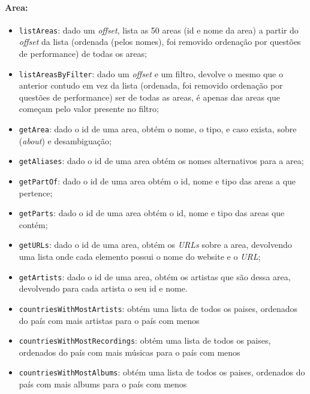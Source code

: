 \documentclass{article}
\begin{document}
\paragraph{\textbf{Area:}}
    \begin{itemize}
        \item \texttt{listAreas}: dado um \textit{offset}, lista as 50 areas (id e nome da area) a partir do \textit{offset} da lista (ordenada (pelos nomes), foi removido ordenação por questões de performance) de todas os areas;
        \item \texttt{listAreasByFilter}: dado um \textit{offset} e um filtro, devolve o mesmo que o anterior contudo em vez da lista (ordenada, foi removido ordenação por questões de performance) ser de todas as areas, é apenas das areas que começam pelo valor presente no filtro;
        \item \texttt{getArea}: dado o id de uma area, obtém o nome, o tipo, e caso exista, sobre (\textit{about}) e desambiguação;
        \item \texttt{getAliases}: dado o id de uma area obtém os nomes alternativos para a area;
        \item \texttt{getPartOf}: dado o id de uma area obtém o id, nome e tipo das areas a que pertence;
        \item \texttt{getParts}: dado o id de uma area obtém o id, nome e tipo das areas que contém;
        \item \texttt{getURLs}: dado o id de uma area, obtém os \textit{URLs} sobre a area, devolvendo uma lista onde cada elemento possui o nome do website e o \textit{URL};
        \item \texttt{getArtists}: dado o id de uma area, obtém os artistas que são dessa area, devolvendo para cada artista o seu id e nome.
        \item \texttt{countriesWithMostArtists}: obtém uma lista de todos os paises, ordenados do país com mais artistas para o país com menos
        \item \texttt{countriesWithMostRecordings}: obtém uma lista de todos os paises, ordenados do país com mais músicas para o país com menos
        \item \texttt{countriesWithMostAlbums}: obtém uma lista de todos os paises, ordenados do país com mais albums para o país com menos
    \end{itemize}
\end{document}
